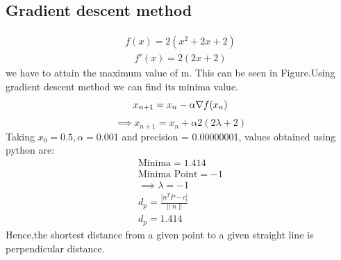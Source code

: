 \documentclass[10pt, a4paper]{article}
\begin{document}
    \subsection*{\normalsize Gradient descent method}
    
    \begin{align}
	\label{eq:vol_varx}
	f(x) = 2(x^2+2x+2)
\end{align}
\begin{align}   
    f'(x) = 2(2x+2)
	\end{align}
we have to attain the maximum value of m. This can be seen in Figure.Using gradient descent method we can find its minima value.
\begin{equation}
        x_{n+1} = x_n - \alpha \nabla f(x_n) \\
\end{equation}
\vspace{1mm}
\begin{equation}
\implies x_{n+1}=x_n+\alpha2(2\lambda+2)
\end{equation}
Taking $x_0=0.5,\alpha=0.001$ and precision = 0.00000001, values obtained using python are:
    \begin{align}
        \text{Minima} = 1.414\\        
        \text{Minima Point} = -1\\
        \implies \lambda=-1\\
         d_p=\frac{|n^TP-c|}{\|n\|}\\
         d_p = 1.414 
    \end{align}
Hence,the shortest distance from a given point to a given straight line is perpendicular distance.    
   
\end{document}

